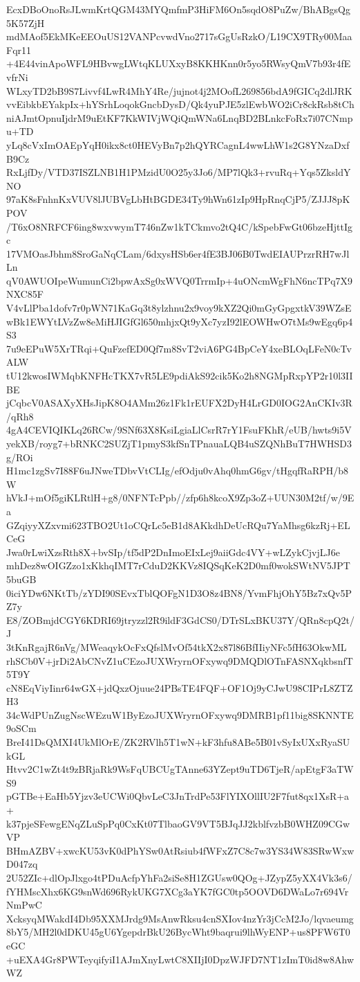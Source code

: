 EcxDBoOnoRsJLwmKrtQGM43MYQmfmP3HiFM6On5sqdO8PuZw/BhABgsQg5K57ZjH
mdMAof5EkMKeEEOuUS12VANPcvwdVno2717sGgUsRzkO/L19CX9TRy00MaaFqr11
+4E44vinApoWFL9HBvwgLWtqKLUXxyB8KKHKnn0r5yo5RWsyQmV7b93r4fEvfrNi
WLxyTD2bB9S7Livvf4LwR4MhY4Re/jujnot4j2MOofL269856bdA9fGICq2dlJRK
vvEibkbEYakpIx+hYSrhLoqokGncbDysD/Qk4yuPJE5zlEwbWO2iCr8ckRsb8tCh
niAJmtOpnuIjdrM9uEtKF7KkWIVjWQiQmWNa6LnqBD2BLnkcFoRx7i07CNmpu+TD
yLq8cVxImOAEpYqH0ikx8ct0HEVyBn7p2hQYRCagnL4wwLhW1s2G8YNzaDxfB9Cz
RxLjfDy/VTD37ISZLNB1H1PMzidU0O25y3Jo6/MP7lQk3+rvuRq+Yqs5ZksldYNO
97aK8sFnhnKxVUV8lJUBVgLbHtBGDE34Ty9hWn61zIp9HpRnqCjP5/ZJJJ8pKPOV
/T6xO8NRFCF6ing8wxvwymT746nZw1kTCkmvo2tQ4C/kSpebFwGt06bzeHjttIgc
17VMOasJbhm8SroGaNqCLam/6dxysHSb6er4fE3BJ06B0TwdEIAUPrzrRH7wJlLn
qV0AWUOIpeWumunCi2bpwAxSg0xWVQ0TrrmIp+4uONcmWgFhN6ncTPq7X9NXC85F
V4vLlPba1dofv7r0pWN71KaGq3t8ylzhnu2x9voy9kXZ2Qi0mGyGpgxtkV39WZsE
wBk1EWYtLVzZw8eMiHJIGfGl650mhjxQt9yXc7yzI92lEOWHwO7tMs9wEgq6p4S3
7u9eEPuW5XrTRqi+QuFzefED0Qf7m8SvT2viA6PG4BpCeY4xeBLOqLFeN0cTvALW
tU12kwosIWMqbKNFHcTKX7vR5LE9pdiAkS92cik5Ko2h8NGMpRxpYP2r10l3IIBE
jCqbcV0ASAXyXHsJipK8O4AMm26z1Fk1rEUFX2DyH4LrGD0IOG2AnCKIv3R/qRh8
4gA4CEVIQIKLq26RCw/9SNf63X8KsiLgiaLlCsrR7rY1FsuFKhR/eUB/hwts9i5V
yekXB/royg7+bRNKC2SUZjT1pmyS3kfSnTPnauaLQB4uSZQNhBuT7HWHSD3g/ROi
H1mc1zgSv7I88F6uJNweTDbvVtCLIg/efOdju0vAhq0hmG6gv/tHgqfRaRPH/b8W
hVkJ+mOf5giKLRtlH+g8/0NFNTcPpb//zfp6h8kcoX9Zp3oZ+UUN30M2tf/w/9Ea
GZqiyyXZxvmi623TBO2Ut1oCQrLc5eB1d8AKkdhDeUcRQu7YaMhsg6kzRj+ELCeG
Jwa0rLwiXzsRth8X+bvSIp/tf5dP2DnImoEIxLej9aiiGdc4VY+wLZykCjvjLJ6e
mhDez8wOIGZzo1xKkhqIMT7rCduD2KKVz8IQSqKeK2D0mf0wokSWtNV5JPT5buGB
0iciYDw6NKtTb/zYDI90SEvxTblQOFgN1D3O8z4BN8/YvmFhjOhY5Bz7xQv5PZ7y
E8/ZOBmjdCGY6KDRI69jtryzzl2R9ildF3GdCS0/DTrSLxBKU37Y/QRn8cpQ2t/J
3tKnRgajR6nVg/MWeaqykOcFxQfslMvOf54tkX2x87l86BfIIiyNFc5fH63OkwML
rhSCb0V+jrDi2AbCNvZ1uCEzoJUXWryrnOFxywq9DMQDlOTnFASNXqkbsnfT5T9Y
cN8EqViyIinr64wGX+jdQxzOjuue24PBsTE4FQF+OF1Oj9yCJwU98CIPrL8ZTZH3
34cWdPUnZugNscWEzuW1ByEzoJUXWryrnOFxywq9DMRB1pf11big8SKNNTE9oSCm
BreI41DsQMXI4UkMlOrE/ZK2RVlh5T1wN+kF3hfu8ABe5B01vSyIxUXxRyaSUkGL
Htvv2C1wZt4t9zBRjaRk9WsFqUBCUgTAnne63YZept9uTD6TjeR/apEtgF3aTWS9
pGTBe+EaHb5Yjzv3eUCWi0QbvLeC3JnTrdPe53FlYIXOllIU2F7fut8qx1XsR+a+
k37pjeSFewgENqZLuSpPq0CxKt07TlbaoGV9VT5BJqJJ2kblfvzbB0WHZ09CGwVP
BHmAZBV+xwcKU53vK0dPhYSw0AtRsiub4fWFxZ7C8c7w3YS34W83SRwWxwD047zq
2U52ZIc+dlOpJlxgo4tPDuAcfpYhFa2siSe8H1ZGUsw0QOg+JZypZ5yXX4Vk3s6/
fYHMscXhx6KG9snWd696RykUKG7XCg3aYK7fGC0tp5OOVD6DWaLo7r694VrNmPwC
XcksyqMWakdI4Db95XXMJrdg9MsAnwRksu4cnSXIov4nzYr3jCcM2Jo/lqvaeumg
8bY5/MH2l0dDKU45gU6YgepdrBkU26BycWht9baqrui9lhWyENP+us8PFW6T0eGC
+uEXA4Gr8PWTeyqifyiI1AJmXnyLwtC8XIIjI0DpzWJFD7NT1zImT0id8w8AhwWZ
